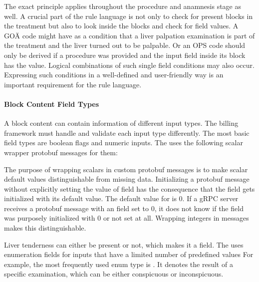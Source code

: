 The exact principle applies throughout the procedure and anamnesis stage as well.
A crucial part of the rule language is not only to check for present blocks in the treatment
but also to look inside the blocks and check for field values.
A GOÄ code might have as a condition that a liver palpation examination is part of the treatment and
the liver turned out to be palpable.
Or an OPS code should only be derived if a  procedure was provided and the
input field  inside its block has the value\true.
Logical combinations of such single field conditions may also occur.
Expressing such conditions in a well-defined and user-friendly way is an important requirement for the rule language.

\paragraph{Block Content Field Types}
A block content can contain information of different input types.
The billing framework must handle and validate each input type differently.
The most basic field types are boolean flags and numeric inputs.
The \AVS uses the following scalar wrapper protobuf messages for them:



The purpose of wrapping scalars in custom protobuf messages is to make scalar default values distinguishable from missing data.
Initializing a protobuf message without explicitly setting the value of field has the consequence that the field gets initialized with its default value.
The default value for  is 0.
If a gRPC server receives a protobuf message with an  field set to 0, it does not know if the field was purposely initialized with 0 or not set at all.
Wrapping integers in  messages makes this distinguishable.

Liver tenderness can either be present or not, which makes it a  field.
The \AVS uses enumeration fields for inputs that have a limited number of predefined values
For example, the most frequently used enum type is .
It denotes the result of a specific examination, which can be either conspicuous or inconspicuous.




